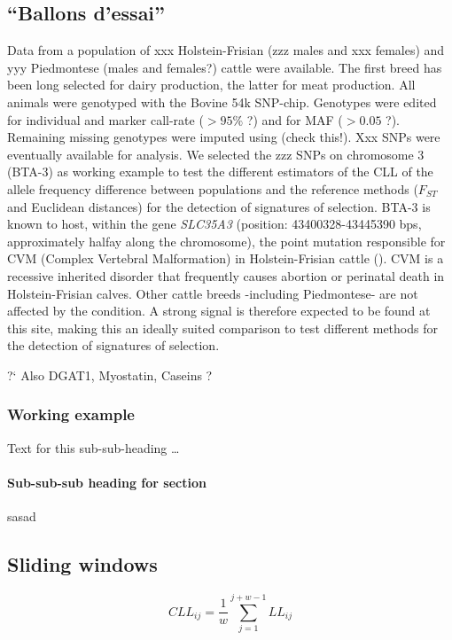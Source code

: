 \documentclass{bmcart}
\begin{document}
\subsection*{``Ballons d'essai''}

Data from a population of xxx Holstein-Frisian (zzz males and xxx
females) and yyy Piedmontese (males and females?)
cattle were available. The first breed has been long selected for dairy
production, the latter for meat production. All animals were genotyped
with the Bovine 54k SNP-chip. Genotypes were edited for individual and
marker call-rate ($>95\%$ ?) and for MAF ($>0.05$ ?). Remaining missing
genotypes were imputed using (check this!). Xxx SNPs were eventually
available for analysis. We selected the zzz SNPs on chromosome 3 (BTA-3) as
working example to test the different estimators of the CLL of the
allele frequency difference between populations and the reference
methods ($F_{ST}$ and Euclidean distances) for the detection of
signatures of selection.
BTA-3 is known to host, within the gene \emph{SLC35A3} (position:
43400328-43445390 bps, approximately halfay along the chromosome), the point mutation responsible for CVM (Complex
Vertebral Malformation) in Holstein-Frisian cattle (\cite{thomsen2006missense}).  
CVM is a recessive inherited disorder that frequently causes abortion or perinatal
death in Holstein-Frisian calves. Other cattle breeds -including Piedmontese- are not affected by
the condition. A strong signal is therefore expected to be found at this
site, making this an ideally suited comparison to test different methods
for the detection of signatures of selection.

?` Also DGAT1, Myostatin, Caseins ?

\subsubsection*{Working example}
Text for this sub-sub-heading \ldots
\paragraph*{Sub-sub-sub heading for section}
sasad

\subsection*{Sliding windows}

\begin{equation}
CLL_{ij}=\frac{1}{w}\sum_{j=1}^{j+w-1}LL_{ij}
\end{equation}
\end{document}
